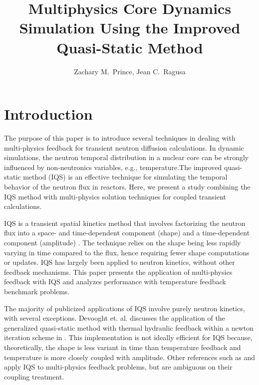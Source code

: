 \documentclass{anstrans}
\title{Multiphysics Core Dynamics Simulation Using the Improved Quasi-Static Method}
\author{Zachary M.~Prince, Jean C.~Ragusa}
\institute{Department of Nuclear Engineering, Texas A\&M University, College Station, TX}
\begin{document}
\vspace*{-42pt}
\begin{strip}
\vspace*{14pt}
\end{strip}


\section{Introduction}

The purpose of this paper is to introduce several techniques in dealing with multi-physics feedback for transient neutron diffusion calculations.  In dynamic simulations, the neutron temporal distribution in a nuclear core can be strongly influenced by non-neutronics variables, e.g., temperature.The improved quasi-static method (IQS) is an effective technique for simulating the temporal behavior of the neutron flux in reactors. Here, we present a study combining the IQS method with multi-physics solution techniques for coupled transient calculations.

IQS is a transient spatial kinetics method that involves factorizing the neutron flux into a space- and time-dependent component (shape) and a time-dependent component (amplitude) \cite{Ott_1966,Dulla2008}. The technique relies on the shape being less rapidly varying in time compared to the flux, hence requiring fewer shape computations or updates. IQS has largely been applied to neutron kinetics, without other feedback mechanisms. This paper presents the application of multi-physics feedback with IQS and analyzes performance with temperature feedback benchmark problems.

The majority of publicized applications of IQS involve purely neutron kinetics, with several exceptions.  Devooght et. al. discusses the application of the generalized quasi-static method with thermal hydraulic feedback within a newton iteration scheme in \cite{Devooght_1984}. This implementation is not ideally efficient for IQS because, theoretically, the shape is less variant in time than temperature feedback and temperature is more closely coupled with amplitude.  Other references such as \cite{Banfield_2013} and \cite{KIKO3D_2003} apply IQS to multi-physics feedback problems, but are ambiguous on their coupling treatment.
\end{document}
